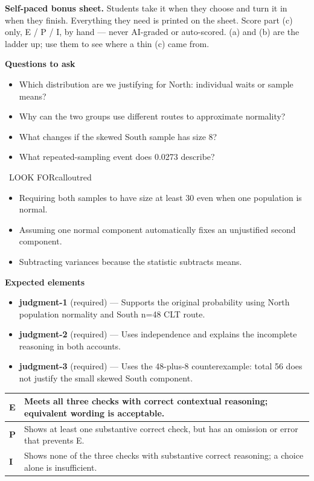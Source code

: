 \documentclass[11pt]{article}
\begin{document}
\textbf{Self-paced bonus sheet.} Students take it when they choose and turn it in when they finish. Everything they need is printed on the sheet. Score part (c) only, E / P / I, by hand --- never AI-graded or auto-scored. (a) and (b) are the ladder up; use them to see where a thin (c) came from.\par

\textbf{Questions to ask}
\begin{itemize}[leftmargin=1.5em,itemsep=2pt,topsep=2pt]
  \item Which distribution are we justifying for North: individual waits or sample means?
  \item Why can the two groups use different routes to approximate normality?
  \item What changes if the skewed South sample has size 8?
  \item What repeated-sampling event does 0.0273 describe?
\end{itemize}

\begin{callout}{\IconWarn\ LOOK FOR}{calloutred}
\begin{itemize}[leftmargin=1.5em,itemsep=2pt,topsep=2pt]
  \item Requiring both samples to have size at least 30 even when one population is normal.
  \item Assuming one normal component automatically fixes an unjustified second component.
  \item Subtracting variances because the statistic subtracts means.
\end{itemize}
\end{callout}


\textbf{Expected elements}
\begin{itemize}[leftmargin=1.5em,itemsep=2pt,topsep=2pt]
  \item \textbf{judgment-1} (required) --- Supports the original probability using North population normality and South n=48 CLT route.
  \item \textbf{judgment-2} (required) --- Uses independence and explains the incomplete reasoning in both accounts.
  \item \textbf{judgment-3} (required) --- Uses the 48-plus-8 counterexample: total 56 does not justify the small skewed South component.
\end{itemize}

{\small\renewcommand{\arraystretch}{1.25}
\noindent\begin{tabular}{|p{0.5in}|p{5.9in}|}
\hline
\textbf{E} & Meets all three checks with correct contextual reasoning; equivalent wording is acceptable. \\ \hline
\textbf{P} & Shows at least one substantive correct check, but has an omission or error that prevents E. \\ \hline
\textbf{I} & Shows none of the three checks with substantive correct reasoning; a choice alone is insufficient. \\ \hline
\end{tabular}}
\end{document}
